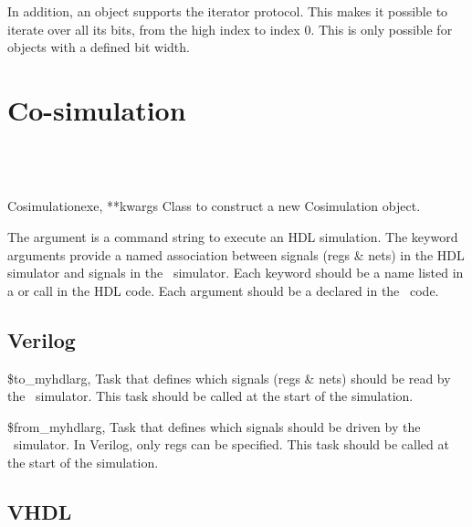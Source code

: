 In addition, an  object supports the iterator protocol. This
makes it possible to iterate over all its bits, from the high index to
index 0. This is only possible for  objects with a
defined bit width.


\section{Co-simulation\label{ref-cosim}}

\subsection{\myhdl\ \label{ref-cosim-myhdl}}

\begin{classdesc}{Cosimulation}{exe, **kwargs}
Class to construct a new Cosimulation object. 

The  argument is a command string to
execute an HDL simulation. The  keyword
arguments provide a named association between signals
(regs \& nets) in the HDL simulator and signals in the
\myhdl\ simulator. Each keyword should be a name listed
in a  or  call in
the HDL code. Each argument should be a 
declared in the \myhdl\ code.

\end{classdesc}

\subsection{Verilog \label{ref-cosim-verilog}}

\begin{funcdesc}{\$to_myhdl}{arg, }
Task that defines which signals (regs \& nets) should be
read by the \myhdl\ simulator.
This task should be called at the start of the simulation.
\end{funcdesc}

\begin{funcdesc}{\$from_myhdl}{arg, }
Task that defines which signals should be
driven by the \myhdl\ simulator. In Verilog, only regs
can be specified.
This task should be called at the start of the simulation.
\end{funcdesc}


\subsection{VHDL \label{ref-cosim-vhdl}}

